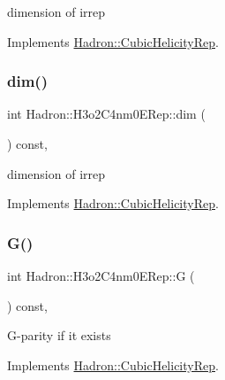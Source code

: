 dimension of irrep 

Implements \mbox{\hyperlink{structHadron_1_1CubicHelicityRep_a95d229a05580e65f8bdde74a1e316855}{Hadron\+::\+Cubic\+Helicity\+Rep}}.

\mbox{\label{structHadron_1_1H3o2C4nm0ERep_a7ee17e5a57ef66d6ed9343f61a10721b}} 
\subsubsection{\texorpdfstring{dim()}{dim()}\hspace{0.1cm}{\footnotesize\ttfamily [3/3]}}
{\footnotesize\ttfamily int Hadron\+::\+H3o2\+C4nm0\+E\+Rep\+::dim (\begin{DoxyParamCaption}{ }\end{DoxyParamCaption}) const\hspace{0.3cm}{\ttfamily [inline]}, {\ttfamily [virtual]}}

dimension of irrep 

Implements \mbox{\hyperlink{structHadron_1_1CubicHelicityRep_a95d229a05580e65f8bdde74a1e316855}{Hadron\+::\+Cubic\+Helicity\+Rep}}.

\mbox{\label{structHadron_1_1H3o2C4nm0ERep_a0dbed874e65f17f90f2b09c97b54f679}} 
\subsubsection{\texorpdfstring{G()}{G()}\hspace{0.1cm}{\footnotesize\ttfamily [1/3]}}
{\footnotesize\ttfamily int Hadron\+::\+H3o2\+C4nm0\+E\+Rep\+::G (\begin{DoxyParamCaption}{ }\end{DoxyParamCaption}) const\hspace{0.3cm}{\ttfamily [inline]}, {\ttfamily [virtual]}}

G-\/parity if it exists 

Implements \mbox{\hyperlink{structHadron_1_1CubicHelicityRep_a50689f42be1e6170aa8cf6ad0597018b}{Hadron\+::\+Cubic\+Helicity\+Rep}}.

\mbox{\label{structHadron_1_1H3o2C4nm0ERep_a0dbed874e65f17f90f2b09c97b54f679}} 

